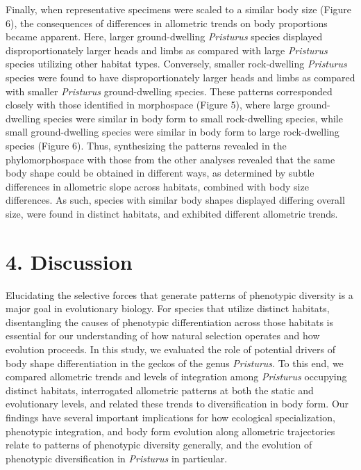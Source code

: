 \documentclass[
  11pt,
]{article}
\begin{document}
Finally, when representative specimens were scaled to a similar body
size (Figure 6), the consequences of differences in allometric trends on
body proportions became apparent. Here, larger ground-dwelling
\emph{Pristurus} species displayed disproportionately larger heads and
limbs as compared with large \emph{Pristurus} species utilizing other
habitat types. Conversely, smaller rock-dwelling \emph{Pristurus}
species were found to have disproportionately larger heads and limbs as
compared with smaller \emph{Pristurus} ground-dwelling species. These
patterns corresponded closely with those identified in morphospace
(Figure 5), where large ground-dwelling species were similar in body
form to small rock-dwelling species, while small ground-dwelling species
were similar in body form to large rock-dwelling species (Figure 6).
Thus, synthesizing the patterns revealed in the phylomorphospace with
those from the other analyses revealed that the same body shape could be
obtained in different ways, as determined by subtle differences in
allometric slope across habitats, combined with body size differences.
As such, species with similar body shapes displayed differing overall
size, were found in distinct habitats, and exhibited different
allometric trends. \hfill\break

\hypertarget{discussion}{%
\section{4. Discussion}\label{discussion}}

Elucidating the selective forces that generate patterns of phenotypic
diversity is a major goal in evolutionary biology. For species that
utilize distinct habitats, disentangling the causes of phenotypic
differentiation across those habitats is essential for our understanding
of how natural selection operates and how evolution proceeds. In this
study, we evaluated the role of potential drivers of body shape
differentiation in the geckos of the genus \emph{Pristurus}. To this
end, we compared allometric trends and levels of integration among
\emph{Pristurus} occupying distinct habitats, interrogated allometric
patterns at both the static and evolutionary levels, and related these
trends to diversification in body form. Our findings have several
important implications for how ecological specialization, phenotypic
integration, and body form evolution along allometric trajectories
relate to patterns of phenotypic diversity generally, and the evolution
of phenotypic diversification in \emph{Pristurus} in particular.
\hfill\break
\end{document}
